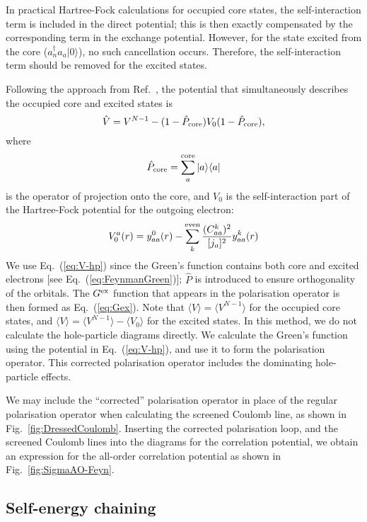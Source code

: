 \documentclass[10pt,twocolumn,a4paper]{article}%
\newcommand{\bra}[1]{\ensuremath{\langle #1|}}	%
\newcommand{\ket}[1]{\ensuremath{|#1\rangle}}
\newcommand{\braket}[1]{\ensuremath{\langle #1\rangle}}	%
\newcommand{\be}{\begin{equation}}
\newcommand{\ee}{\end{equation}}
\begin{document}
In practical Hartree-Fock calculations for occupied core states, the self-interaction term is included in the direct potential; this is then exactly compensated by the corresponding term in the exchange potential. 
However, for the state excited from the core ($a_n^\dag a_a\ket{0}$), no such cancellation occurs.
Therefore, the self-interaction term should be removed for the excited states.




Following the approach from Ref.~\cite{DzubaCPM1989plaEn}, the potential that simultaneously describes the occupied core and excited states is
\be\label{eq:V-hp}
\hat V = V^{N-1} - (1-\hat P_{\rm core})V_0 (1-\hat P_{\rm core}),
\ee
where
\be
\hat P_{\rm core} = \sum_a^{\rm core}\ket{a}\bra{a}
\ee
is the operator of projection onto the core, and $V_0$ is the self-interaction part of the Hartree-Fock potential for the outgoing electron:
 \be
V_0^a(r) = y^0_{aa}(r) - \sum_k^{\rm even}\frac{(C^k_{aa})^2}{[j_a]^2}y^k_{aa}(r)
\ee
%
We use Eq.~(\ref{eq:V-hp}) since the Green's function contains both core and excited electrons [see Eq.~(\ref{eq:FeynmanGreen})]; $\hat P$ is introduced to ensure orthogonality of the orbitals.
The $G^{\rm ex}$ function that appears in the polarisation operator is then formed as Eq.~(\ref{eq:Gex}).
Note that $\braket{V}=\braket{V^{N-1}}$ for the occupied core states, and
$\braket{V}=\braket{V^{N-1}}-\braket{V_0}$ for the excited states.
In this method, we do not calculate the hole-particle diagrams directly.
We calculate the Green's function using the potential in Eq.~(\ref{eq:V-hp}), and use it to form the polarisation operator.
This corrected polarisation operator includes the dominating hole-particle effects.



We may include the ``corrected'' polarisation operator in place of the regular polarisation operator when calculating the screened Coulomb line, as shown in Fig.~\ref{fig:DressedCoulomb}.
Inserting the corrected polarisation loop, and the screened Coulomb lines into the diagrams for the correlation potential, we obtain an expression for the all-order correlation potential as shown in Fig.~\ref{fig:SigmaAO-Feyn}.







\subsection{Self-energy chaining}
\end{document}
